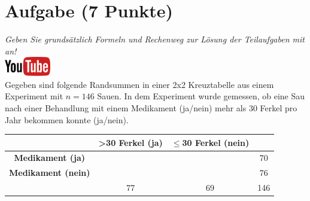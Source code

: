 \documentclass[a4paper, 10pt]{scrartcl}\usepackage[]{graphicx}\usepackage[]{xcolor}
\begin{document}
\section{Aufgabe \hfill (7 Punkte)}

\textit{Geben Sie grunds{\"a}tzlich Formeln und Rechenweg zur L{\"o}sung der
  Teilaufgaben mit an!} \\[1Ex]

\hfill\href{https://youtu.be/jakM7fHyZfU}{\includegraphics[width =
  2cm]{img/youtube}}\\[1Ex]




Gegeben sind folgende Randsummen in einer 2x2 Kreuztabelle aus einem
Experiment mit $n = 146$ Sauen. In dem Experiment wurde gemessen,
ob eine Sau nach einer Behandlung mit einem Medikament (ja/nein)
mehr als 30 Ferkel pro Jahr bekommen konnte (ja/nein).

\vspace{5Ex}

\begin{center}
  \Large
  \begin{tabular}{c|c|c|c}
     & \textbf{>30 Ferkel (ja)} & \textbf{$\leq$30 Ferkel (nein)} &  \strut\\
    \hline
    \textbf{Medikament (ja)} & \phantom{100}  & \phantom{100}  &   70  \strut\\
    \hline
    \textbf{Medikament (nein)} & \phantom{100}  & \phantom{100}  &   76   \strut\\
    \hline
     &  77 &  69 &  146  \strut\\
  \end{tabular}
\end{center}



\vspace{5Ex}
\end{document}
